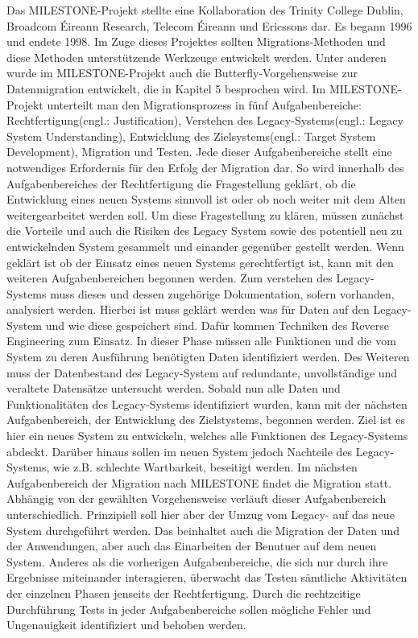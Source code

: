 Das MILESTONE-Projekt stellte eine Kollaboration des Trinity College Dublin, Broadcom Éireann Research, Telecom Éireann und Ericssons dar. Es begann 1996 und endete 1998. Im Zuge dieses Projektes sollten Migrations-Methoden und diese Methoden unterstützende Werkzeuge entwickelt werden.\cite[S. 3]{wuLawless-1997} Unter anderen wurde im MILESTONE-Projekt auch die Butterfly-Vorgehensweise zur Datenmigration entwickelt, die in Kapitel 5 besprochen wird.\cite[S. 3]{wuLawless-1997} 
\lb
Im MILESTONE-Projekt unterteilt man den Migrationsprozess in fünf Aufgabenbereiche: Rechtfertigung(engl.: Justification), Verstehen des Legacy-Systems(engl.: Legacy System Understanding), Entwicklung des Zielsystems(engl.: Target System Development), Migration und Testen.\cite[S. 3]{wuLawless-1997} Jede dieser Aufgabenbereiche stellt eine notwendiges Erfordernis für den Erfolg der Migration dar. So wird innerhalb des Aufgabenbereiches der Rechtfertigung die Fragestellung geklärt, ob die Entwicklung eines neuen Systems sinnvoll ist oder ob noch weiter mit dem Alten weitergearbeitet werden soll. Um diese Fragestellung zu klären, müssen zunächst die Vorteile und auch die Risiken des Legacy System sowie des potentiell neu zu entwickelnden System gesammelt und einander gegenüber gestellt werden.\cite[S. 3]{wuLawless-1997}
\lb
Wenn geklärt ist ob der Einsatz eines neuen Systems gerechtfertigt ist, kann mit den weiteren Aufgabenbereichen begonnen werden. Zum verstehen des Legacy-Systems muss dieses und dessen zugehörige Dokumentation, sofern vorhanden, analysiert werden.\cite[S. 3f]{wuLawless-1997} Hierbei ist muss geklärt werden was für Daten auf den Legacy-System und wie diese gespeichert sind. Dafür kommen Techniken des Reverse Engineering zum Einsatz.\cite[S. 3f]{wuLawless-1997} In dieser Phase müssen alle Funktionen und die vom System zu deren Ausführung benötigten Daten identifiziert werden. Des Weiteren muss der Datenbestand des Legacy-System auf redundante, unvollständige und veraltete Datensätze untersucht werden.\cite[S. 3f]{wuLawless-1997}
\lb
Sobald nun alle Daten und Funktionalitäten des Legacy-Systems identifiziert wurden, kann mit der nächsten Aufgabenbereich, der Entwicklung des Zielstystems, begonnen werden. Ziel ist es hier ein neues System zu entwickeln, welches alle Funktionen des Legacy-Systems abdeckt. Darüber hinaus sollen im neuen System jedoch Nachteile des Legacy-Systems, wie z.B. schlechte Wartbarkeit, beseitigt werden.\cite[S. 3ff]{wuLawless-1997} 
\lb
Im nächsten Aufgabenbereich der Migration nach MILESTONE findet die Migration statt. Abhängig von der gewählten Vorgehensweise verläuft dieser Aufgabenbereich unterschiedlich. Prinzipiell soll hier aber der Umzug vom Legacy- auf das neue System durchgeführt werden. Das beinhaltet auch die Migration der Daten und der Anwendungen, aber auch das Einarbeiten der Benutuer auf dem neuen System.\cite[S. 3ff]{wuLawless-1997}
\lb
Anderes als die vorherigen Aufgabenbereiche, die sich nur durch ihre Ergebnisse miteinander interagieren, überwacht das Testen sämtliche Aktivitäten der einzelnen Phasen jenseits der Rechtfertigung. Durch die rechtzeitige Durchführung Tests in jeder Aufgabenbereiche sollen mögliche Fehler und Ungenauigkeit identifiziert  und behoben werden.\cite[S. 3f]{wuLawless-1997}

